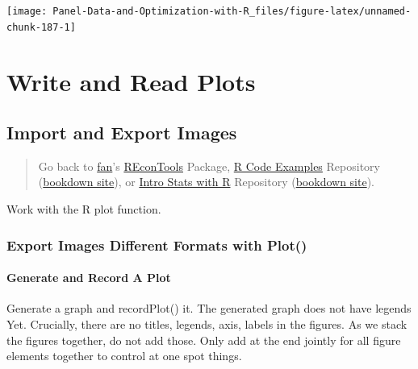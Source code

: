 \documentclass[
]{book}
\begin{document}
\begin{center}\texttt{[image: Panel-Data-and-Optimization-with-R\_files/figure-latex/unnamed-chunk-187-1]} \end{center}

\hypertarget{write-and-read-plots}{%
\section{Write and Read Plots}\label{write-and-read-plots}}

\hypertarget{import-and-export-images}{%
\subsection{Import and Export Images}\label{import-and-export-images}}

\begin{quote}
Go back to \href{http://fanwangecon.github.io/}{fan}'s \href{https://fanwangecon.github.io/REconTools/}{REconTools} Package, \href{https://fanwangecon.github.io/R4Econ/}{R Code Examples} Repository (\href{https://fanwangecon.github.io/R4Econ/bookdown}{bookdown site}), or \href{https://fanwangecon.github.io/Stat4Econ/}{Intro Stats with R} Repository (\href{https://fanwangecon.github.io/Stat4Econ/bookdown}{bookdown site}).
\end{quote}

Work with the R plot function.

\hypertarget{export-images-different-formats-with-plot}{%
\subsubsection{Export Images Different Formats with Plot()}\label{export-images-different-formats-with-plot}}

\hypertarget{generate-and-record-a-plot}{%
\paragraph{Generate and Record A Plot}\label{generate-and-record-a-plot}}

Generate a graph and recordPlot() it. The generated graph does not have legends Yet. Crucially, there are no titles, legends, axis, labels in the figures. As we stack the figures together, do not add those. Only add at the end jointly for all figure elements together to control at one spot things.
\end{document}

